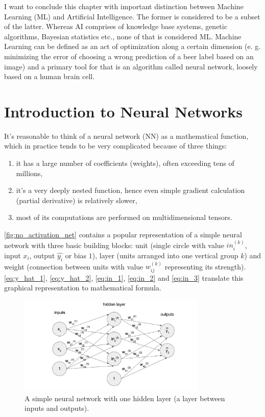 \documentclass[11pt]{article}
\begin{document}
I want to conclude this chapter with important distinction between Machine Learning (ML) and Artificial Intelligence. The former is considered to be a subset of the latter. Whereas AI comprises of knowledge base systems, genetic algorithms, Bayesian statistics etc., none of that is considered ML. Machine Learning can be defined as an act of optimization along a certain dimension (e. g. minimizing the error of choosing a wrong prediction of a beer label based on an image) and a primary tool for that is an algorithm called neural network, loosely based on a human brain cell.
\clearpage

\section{Introduction to Neural Networks} \label{introduction_to_nn}
It's reasonable to think of a neural network (NN) as a mathematical function, which in practice tends to be very complicated because of three things:
\begin{enumerate}[1)]
\item it has a large number of coefficients (weights), often exceeding tens of millions,
\item it's a very deeply nested function, hence even simple gradient calculation (partial derivative) is relatively slower,
\item most of its computations are performed on multidimensional tensors.
\end{enumerate}
\autoref{fig:no_activation_net} contains a popular representation of a simple neural network with three basic building blocks: unit (single circle with value $in_i^{(k)}$, input $x_i$, output $\hat{y_i}$ or bias $1$), layer (units arranged into one vertical group $k$) and weight (connection between units with value $w_{ij}^{(k)}$ representing its strength). \autoref{eq:y_hat_1}, \ref{eq:y_hat_2}, \ref{eq:in_1}, \ref{eq:in_2} and \ref{eq:in_3} translate this graphical representation to mathematical formula.\\

\begin{figure}[h]
\includegraphics[width=0.8\textwidth]{no_activation_net}
\centering
\caption{A simple neural network with one hidden layer (a layer between inputs and outputs).}
\label{fig:no_activation_net}
\end{figure}
\end{document}
